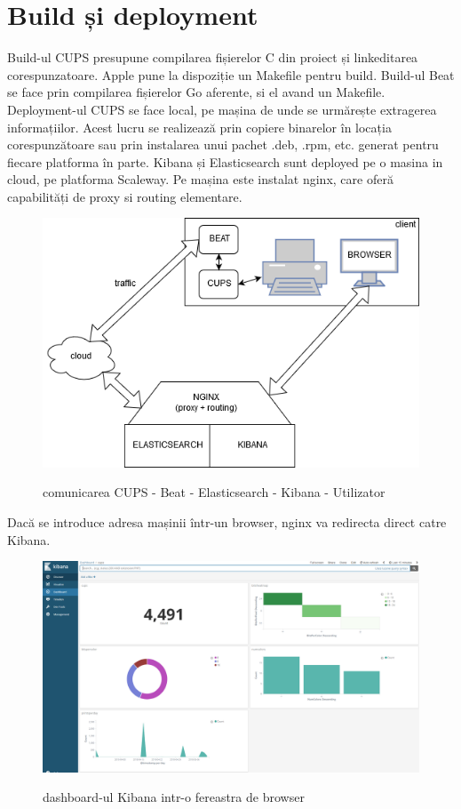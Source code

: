 \documentclass[12pt]{report}
\begin{document}
	\section{Build și deployment}
	Build-ul CUPS presupune compilarea fișierelor C din proiect și linkeditarea corespunzatoare. Apple pune la dispoziție un Makefile pentru build. Build-ul Beat se face prin compilarea fișierelor Go aferente, si el avand un Makefile.
	Deployment-ul CUPS se face local, pe mașina de unde se urmărește extragerea informațiilor. Acest lucru se realizează prin copiere binarelor în locația corespunzătoare sau prin instalarea unui pachet .deb, .rpm, etc. generat pentru fiecare platforma în parte.
	Kibana și Elasticsearch sunt deployed pe o masina in cloud, pe platforma Scaleway. Pe mașina este instalat nginx, care oferă capabilități de proxy si routing elementare.
	\begin{figure}
		\centering
		{\includegraphics[width=130mm]{cups-cloud.png}}
	\caption{comunicarea CUPS - Beat - Elasticsearch - Kibana - Utilizator}
	\end{figure}	
	Dacă se introduce adresa mașinii într-un browser, nginx va redirecta direct catre Kibana.
	\begin{figure}
		\centering
		{\includegraphics[width=160mm]{kibana-dashboard.png}}
		\caption{dashboard-ul Kibana intr-o fereastra de browser}
	\end{figure}
\end{document}
